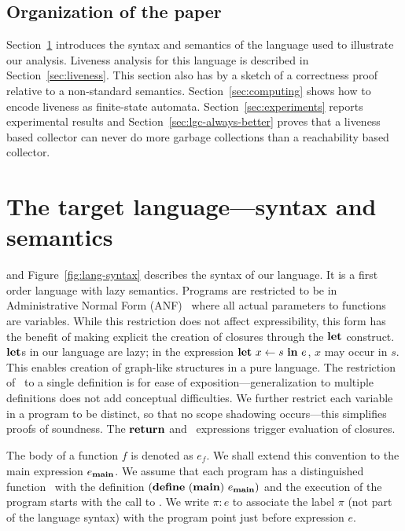 \documentclass[9pt]{sigplanconf}
\begin{document}
\subsection{Organization of the paper}

Section~\ref{sec:defs} introduces the syntax and semantics of the
language used to illustrate our
analysis.
Liveness analysis for this language is  described in
Section~\ref{sec:liveness}. This section also has by  a  sketch  of  a
correctness proof  relative  to  a  non-standard
semantics.  Section~\ref{sec:computing}  shows how to  encode liveness
as   finite-state  automata.    Section~\ref{sec:experiments}  reports
experimental  results  and Section~\ref{sec:lgc-always-better}  proves
that a liveness based collector  can never do more garbage collections
than a reachability based collector.

\section{The target language---syntax and semantics}
\label{sec:defs}
and
Figure~\ref{fig:lang-syntax} describes the  syntax of our language. It
is a first order language with lazy semantics. Programs are restricted
to        be        in        Administrative        Normal        Form
(ANF)~\cite{chakravarty03perspective}  where all actual  parameters to
functions  are  variables.  While  this  restriction  does not  affect
expressibility,  this form  has  the benefit  of  making explicit  the
creation  of closures through  the $\mbox{$\mathbf{ let}$}$  construct.  $\mbox{$\mathbf{ let}$}$s  in our
language  are lazy;  in the  expression $\mbox{$\mathbf{ let}$}\,\,  x  \leftarrow s\,\,
\mbox{$\mathbf{ in}$}\,\, e$, $x$ may occur  in $s$. This enables creation of graph-like
structures in  a pure language. The  restriction of \LET\  to a single
definition  is  for ease  of  exposition---generalization to  multiple
definitions  does  not add conceptual  difficulties.  We  further
restrict each variable  in a program to be distinct,  so that no scope
shadowing   occurs---this  simplifies   proofs   of  soundness.    The
$\mbox{$\mathbf{ return}$}$ and \SIF\ expressions trigger evaluation of closures.

The body  of a function ${\mathit  f}$ is denoted  as $e_{\mathit f}$.
We   shall   extend   this   convention   to   the   main   expression
$e_{\mathbf{main}}$. We assume that each program has a distinguished function
\mainpgm\      with      the      definition     $(\mbox{$\mathbf{define}$}\      ({\tt
  \mathbf{main}})\  e_{\mathbf{main}})$ and  the execution  of the  program starts
with the call to \mainpgm.  We write $\pi\!:\!e$ to associate the label
$\pi$ (not  part of the language  syntax) with the  program point just
before expression $e$.
\end{document}
